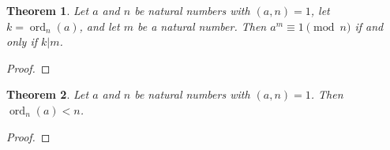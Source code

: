 \documentclass[12pt,leqno]{article}
\numberwithin{equation}{section}
\newtheorem{thm}{Theorem}[section]
\theoremstyle{definition}
\newcommand{\ord}{\operatorname{ord}}
\begin{document}

\begin{thm}
Let $a$ and $n$ be natural numbers with $(a, n) = 1$, let $k =
\ord_n(a)$, and let $m$ be a natural number.  Then $a^m \equiv 1
\pmod{n}$ if and only if $k|m$.
\end{thm}
\begin{proof}[Proof]
\end{proof}

\begin{thm}
Let $a$ and $n$ be natural numbers with $(a, n) = 1$. Then
$\ord_n(a) < n$.
\end{thm}
\begin{proof}[Proof]
\end{proof}
\end{document}
